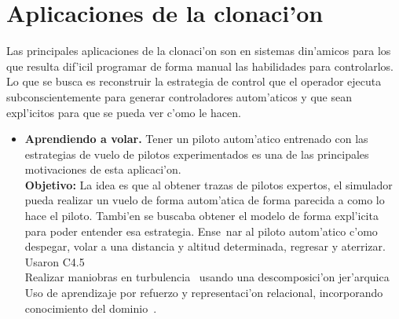 \documentclass[11pt]{article}
\begin{document}
\section{Aplicaciones de la clonaci'on}
Las principales aplicaciones de la clonaci'on son en sistemas din'amicos para los que resulta dif'icil programar de forma manual las habilidades para controlarlos. Lo que se busca es reconstruir la estrategia de control que el operador ejecuta subconscientemente para generar controladores autom'aticos y que sean expl'icitos para que se pueda ver c'omo le hacen.


\begin{itemize}
\item \textbf{Aprendiendo a volar.} Tener un piloto autom'atico entrenado con las estrategias de vuelo de pilotos experimentados es una de las principales motivaciones de esta aplicaci'on.\\
\textbf{Objetivo:} La idea es que al obtener trazas de pilotos expertos, el simulador pueda realizar un vuelo de forma autom'atica de forma parecida a como lo hace el piloto. Tambi'en se buscaba obtener el modelo de forma expl'icita para poder entender esa estrategia. Ense~nar al piloto autom'atico c'omo despegar, volar a una distancia y altitud determinada, regresar y aterrizar. Usaron C4.5~\cite{Sammut92learningto}\\
Realizar maniobras en turbulencia~\cite{Isaac03goal-directedlearning} usando una descomposici'on jer'arquica\\
Uso de aprendizaje por refuerzo y representaci'on relacional, incorporando conocimiento del dominio~\cite{Morales04learningto}.



\end{itemize}
\end{document}
